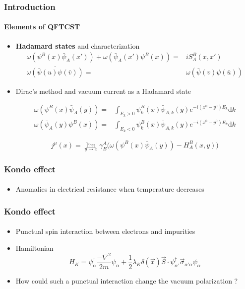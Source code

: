 \documentclass[french]{beamer}
\newcommand{\dd}[0]{\textrm{d}}
\begin{document}
\begin{frame}
\frametitle{Introduction}
\framesubtitle{Elements of QFTCST}

\begin{itemize}

\item \textbf{Hadamard states} and characterization
 \begin{equation*}
\begin{split}
\omega(\psi^B(x)\bar{\psi}_A(x')) + \omega(\bar{\psi}_A(x')\psi^B(x)) = &
iS^B_A(x,x') \\
\overline{\omega(\bar{\psi}(u)\psi(\bar{v}))} = & \omega(\bar{\psi}(v)\psi(\bar{u}))
\end{split}
\end{equation*}

\item Dirac's method and vacuum current as a Hadamard state

\begin{equation*}
\begin{split}
\omega(\psi^B(x)\bar{\psi}_A(y)) = & \int_{E_k >0} \psi_k^B(x)\bar{\psi}_{A,k}(y)e^{-i(x^0-y^0)E_k} \dd k \\
\omega(\bar{\psi}_A(y)\psi^B(x)) = & \int_{E_k <0} \psi_k^B(x)\bar{\psi}_{A,k}(y)e^{-i(x^0-y^0)E_k} \dd k 
\end{split}
\end{equation*}

\begin{equation*}
j^\mu(x) = \lim_{y \rightarrow x} \gamma^A_B \big(
\omega(\psi^B(x)\bar{\psi}_A(y)) - H^B_A (x, y)\big)
\end{equation*}


\end{itemize}

\end{frame}
\begin{frame}
\frametitle{Kondo effect}
\framesubtitle{}
\begin{itemize}
\item Anomalies in electrical resistance when temperature decreases

\end{itemize}

\end{frame}
\begin{frame}
\frametitle{Kondo effect}
\framesubtitle{}
\begin{itemize}
\item Punctual spin interaction between electrons and impurities
\item Hamiltonian
\begin{equation*}
H_K = \psi_\alpha^\dagger \frac{-\nabla^2}{2m}\psi_\alpha +
\frac 1 2\lambda_K \delta(\vec{x})\vec{S}\cdot \psi_{\alpha'}^\dagger  \vec{\sigma}_{\alpha' \alpha} \psi_\alpha
\end{equation*}

\item How could such a punctual interaction change the vacuum polarization ?
\end{itemize}

\end{frame}
\end{document}
